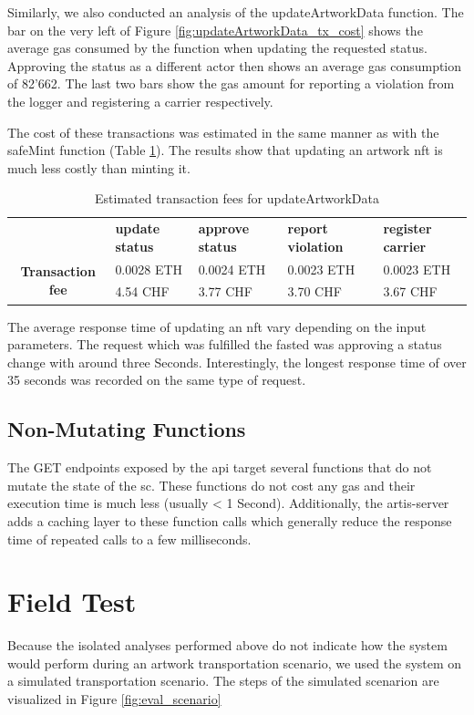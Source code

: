 Similarly, we also conducted an analysis of the updateArtworkData function. The bar on the very left of Figure \ref{fig:updateArtworkData_tx_cost} shows the average gas consumed by the function when updating the requested status. Approving the status as a different actor then shows an average gas consumption of 82'662. The last two bars show the gas amount for reporting a violation from the logger and registering a carrier respectively.

The cost of these transactions was estimated in the same manner as with the safeMint function (Table \ref{tab:updateArtworkData_tx_fees}). The results show that updating an artwork \gls{nft} is much less costly than minting it. 

\begin{table}[ht]
\begin{tabular}{cllll}
                                          & \textbf{update status} & \textbf{approve status} & \textbf{report violation} & \textbf{register carrier} \\ \cline{2-5} 
\multirow{2}{*}{\textbf{Transaction fee}} & 0.0028 ETH             & 0.0024 ETH          & 0.0023 ETH        & 0.0023 ETH       \\
                                          & 4.54 CHF               & 3.77 CHF            & 3.70 CHF          & 3.67 CHF       
\end{tabular}
\caption{Estimated transaction fees for updateArtworkData}
\label{tab:updateArtworkData_tx_fees}
\end{table}

The average response time of updating an \gls{nft} vary depending on the input parameters. The request which was fulfilled the fasted was approving a status change with around three Seconds. Interestingly, the longest response time of over 35 seconds was recorded on the same type of request.


\subsection*{Non-Mutating Functions}
The GET endpoints exposed by the \gls{api} target several functions that do not mutate the state of the \gls{sc}. These functions do not cost any gas and their execution time is much less (usually < 1 Second). Additionally, the artis-server adds a caching layer to these function calls which generally reduce the response time of repeated calls to a few milliseconds. 

\section{Field Test}
\label{sec:field_test}
Because the isolated analyses performed above do not indicate how the system would perform during an artwork transportation scenario, we used the system on a simulated transportation scenario. The steps of the simulated scenarion are visualized in Figure \ref{fig:eval_scenario}

